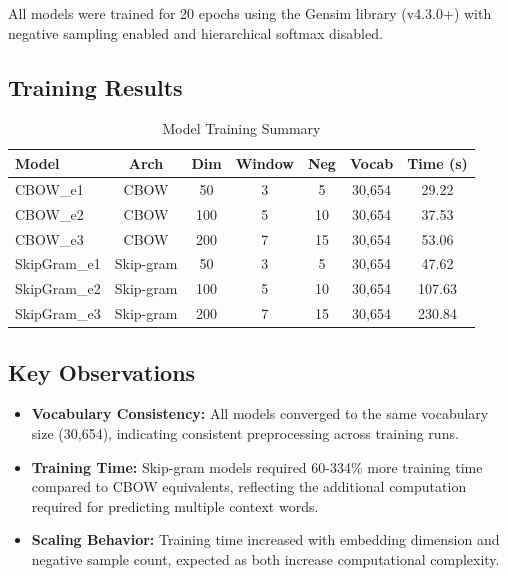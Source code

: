 \documentclass[11pt,a4paper]{report}
\begin{document}
All models were trained for 20 epochs using the Gensim library (v4.3.0+) with negative sampling enabled and hierarchical softmax disabled.

\subsection{Training Results}

\begin{table}[H]
    \centering
    \caption{Model Training Summary}
    \label{tab:training_summary}
    \small
    \begin{tabular}{lcccccc}
        \toprule
        \textbf{Model} & \textbf{Arch} & \textbf{Dim} & \textbf{Window} & \textbf{Neg} & \textbf{Vocab} & \textbf{Time (s)} \\
        \midrule
        CBOW\_e1 & CBOW & 50 & 3 & 5 & 30,654 & 29.22 \\
        CBOW\_e2 & CBOW & 100 & 5 & 10 & 30,654 & 37.53 \\
        CBOW\_e3 & CBOW & 200 & 7 & 15 & 30,654 & 53.06 \\
        SkipGram\_e1 & Skip-gram & 50 & 3 & 5 & 30,654 & 47.62 \\
        SkipGram\_e2 & Skip-gram & 100 & 5 & 10 & 30,654 & 107.63 \\
        SkipGram\_e3 & Skip-gram & 200 & 7 & 15 & 30,654 & 230.84 \\
        \bottomrule
    \end{tabular}
\end{table}

\subsection{Key Observations}

\begin{itemize}
    \item \textbf{Vocabulary Consistency:} All models converged to the same vocabulary size (30,654), indicating consistent preprocessing across training runs.
    \item \textbf{Training Time:} Skip-gram models required 60-334\% more training time compared to CBOW equivalents, reflecting the additional computation required for predicting multiple context words.
    \item \textbf{Scaling Behavior:} Training time increased with embedding dimension and negative sample count, expected as both increase computational complexity.
\end{itemize}
\end{document}
